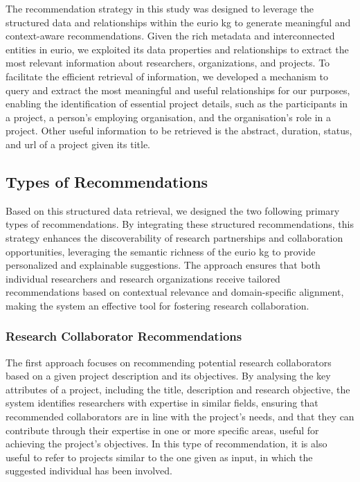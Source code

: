 

The recommendation strategy in this study was designed to leverage the structured data and relationships within the \gls{eurio} \gls{kg} to generate meaningful and context-aware recommendations.
Given the rich metadata and interconnected entities in \gls{eurio}, we exploited its data properties and relationships to extract the most relevant information about researchers, organizations, and projects.
To facilitate the efficient retrieval of information, we developed a mechanism to query and extract the most meaningful and useful relationships for our purposes, enabling the identification of essential project details, such as the participants in a project, a person's employing organisation, and the organisation's role in a project.
Other useful information to be retrieved is the abstract, duration, status, and url of a project given its title.


\subsection*{Types of Recommendations}
Based on this structured data retrieval, we designed the two following primary types of recommendations.
By integrating these structured recommendations, this strategy enhances the discoverability of research partnerships and collaboration opportunities, leveraging the semantic richness of the \gls{eurio} \gls{kg} to provide personalized and explainable suggestions. The approach ensures that both individual researchers and research organizations receive tailored recommendations based on contextual relevance and domain-specific alignment, making the system an effective tool for fostering research collaboration.

\subsubsection*{Research Collaborator Recommendations}
The first approach focuses on recommending potential research collaborators based on a given project description and its objectives.
By analysing the key attributes of a project, including the title, description and research objective, the system identifies researchers with expertise in similar fields, ensuring that recommended collaborators are in line with the project's needs, and that they can contribute through their expertise in one or more specific areas, useful for achieving the project's objectives.
In this type of recommendation, it is also useful to refer to projects similar to the one given as input, in which the suggested individual has been involved.

